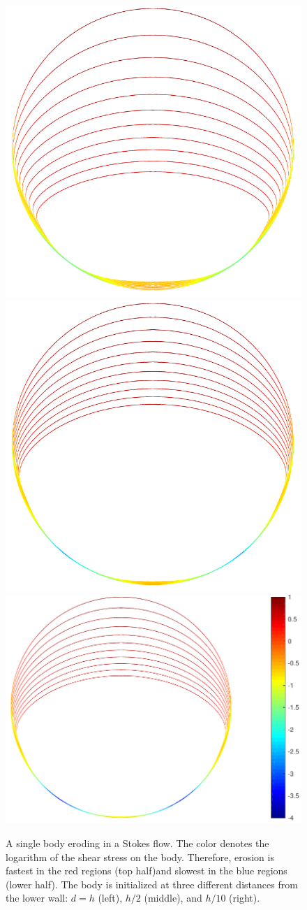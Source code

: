 \documentclass[preprint, 10pt]{elsarticle}
\begin{document}
\begin{figure}[htbp]
\begin{center}
\includegraphics[width = 0.30 \textwidth]{./figs/1b_0d4r1h_shear}
\includegraphics[width = 0.30 \textwidth]{./figs/1b_0d4r0d5h_shear}
\includegraphics[width = 0.38 \textwidth]{./figs/1b_0d4r0d1h_shear}
\caption{\label{fig:NearWall} 
  A single body eroding in a Stokes flow. The color denotes the
  logarithm of the shear stress on the body. Therefore, erosion is
  fastest in the red regions (top half)and slowest in the blue regions
  (lower half).  The body is initialized at three different distances
  from the lower wall: $d=h$ (left), $h/2$ (middle), and $h/10$
  (right).}
\end{center}
\end{figure}
\end{document}
